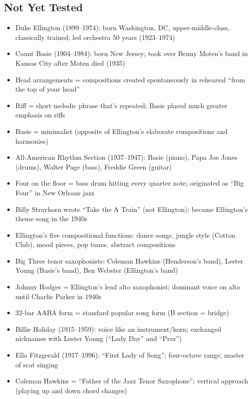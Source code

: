 \documentclass[11pt, letterpaper]{article}
\begin{document}
\subsection*{\textcolor{grayzone}{Not Yet Tested}}
\begin{itemize}[label=$\square$]
    \item Duke Ellington (1899--1974): born Washington, DC, upper-middle-class, classically trained; led orchestra 50 years (1923--1974)
    \item Count Basie (1904--1984): born New Jersey; took over Benny Moten's band in Kansas City after Moten died (1935)
    \item Head arrangements = compositions created spontaneously in rehearsal ``from the top of your head''
    \item Riff = short melodic phrase that's repeated; Basie placed much greater emphasis on riffs
    \item Basie = minimalist (opposite of Ellington's elaborate compositions and harmonies)
    \item All-American Rhythm Section (1937--1947): Basie (piano), Papa Joe Jones (drums), Walter Page (bass), Freddie Green (guitar)
    \item Four on the floor = bass drum hitting every quarter note; originated as ``Big Four'' in New Orleans jazz
    \item Billy Strayhorn wrote ``Take the A Train'' (not Ellington); became Ellington's theme song in the 1940s
    \item Ellington's five compositional functions: dance songs, jungle style (Cotton Club), mood pieces, pop tunes, abstract compositions
    \item Big Three tenor saxophonists: Coleman Hawkins (Henderson's band), Lester Young (Basie's band), Ben Webster (Ellington's band)
    \item Johnny Hodges = Ellington's lead alto saxophonist; dominant voice on alto until Charlie Parker in 1940s
    \item 32-bar AABA form = standard popular song form (B section = bridge)
    \item Billie Holiday (1915--1959): voice like an instrument/horn; exchanged nicknames with Lester Young (``Lady Day'' and ``Prez'')
    \item Ella Fitzgerald (1917--1996): ``First Lady of Song''; four-octave range; master of scat singing
    \item Coleman Hawkins = ``Father of the Jazz Tenor Saxophone''; vertical approach (playing up and down chord changes)

\end{itemize}
\end{document}
